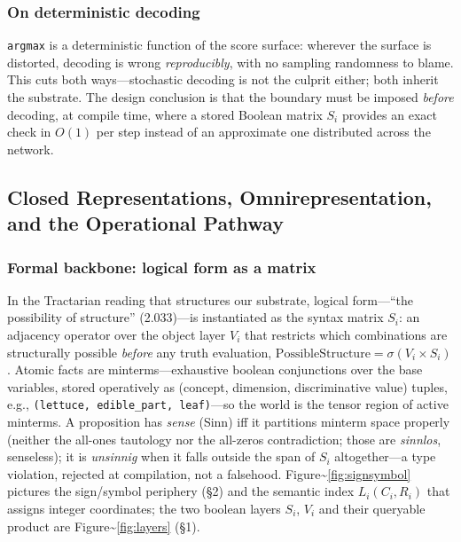 \documentclass{article}
\begin{document}
\hypertarget{on-deterministic-decoding}{%
\subsubsection{On deterministic
decoding}\label{on-deterministic-decoding}}

\texttt{argmax} is a deterministic function of the score surface:
wherever the surface is distorted, decoding is wrong
\emph{reproducibly}, with no sampling randomness to blame. This cuts
both ways---stochastic decoding is not the culprit either; both inherit
the substrate. The design conclusion is that the boundary must be
imposed \emph{before} decoding, at compile time, where a stored Boolean
matrix \(S_i\) provides an exact check in \(O(1)\) per step instead of
an approximate one distributed across the network.

\hypertarget{closed-representations-omnirepresentation-and-the-operational-pathway}{%
\subsection{\texorpdfstring{Closed Representations, Omnirepresentation,
and the Operational Pathway
\label{app:repr}}{Closed Representations, Omnirepresentation, and the Operational Pathway }}\label{closed-representations-omnirepresentation-and-the-operational-pathway}}

\hypertarget{formal-backbone-logical-form-as-a-matrix}{%
\subsubsection{Formal backbone: logical form as a
matrix}\label{formal-backbone-logical-form-as-a-matrix}}

In the Tractarian reading that structures our substrate, logical
form---``the possibility of structure'' (2.033)---is instantiated as the
syntax matrix \(S_i\): an adjacency operator over the object layer
\(V_i\) that restricts which combinations are structurally possible
\emph{before} any truth evaluation,
\(\text{PossibleStructure} = \sigma(V_i \times S_i)\). Atomic facts are
minterms---exhaustive boolean conjunctions over the base variables,
stored operatively as (concept, dimension, discriminative value) tuples,
e.g., \texttt{(lettuce,\ edible\_part,\ leaf)}---so the world is the
tensor region of active minterms. A proposition has \emph{sense} (Sinn)
iff it partitions minterm space properly (neither the all-ones tautology
nor the all-zeros contradiction; those are \emph{sinnlos}, senseless);
it is \emph{unsinnig} when it falls outside the span of \(S_i\)
altogether---a type violation, rejected at compilation, not a falsehood.
Figure\textasciitilde{}\ref{fig:signsymbol} pictures the sign/symbol
periphery (\S2) and the semantic index \(L_i(C_i,R_i)\) that assigns
integer coordinates; the two boolean layers \(S_i\), \(V_i\) and their
queryable product are Figure\textasciitilde{}\ref{fig:layers} (\S1).
\end{document}
